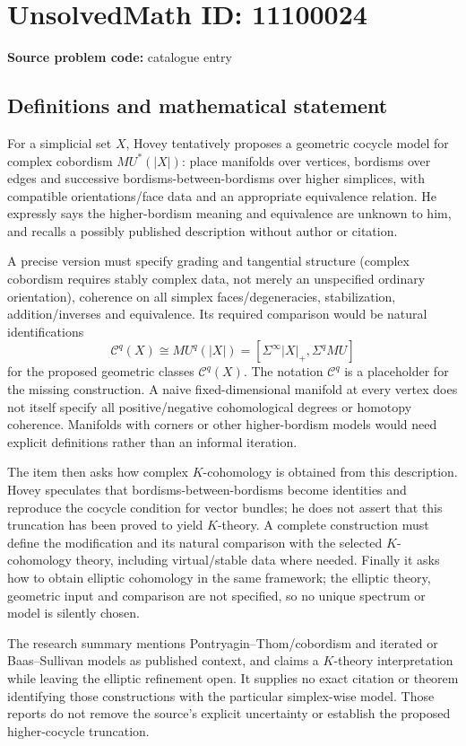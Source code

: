 \documentclass[11pt]{article}
\begin{document}
\section*{UnsolvedMath ID: 11100024}
\textbf{Source problem code:} catalogue entry
\subsection{Definitions and mathematical statement}
For a simplicial set \(X\), Hovey tentatively proposes a geometric cocycle model for complex cobordism \(MU^*(|X|)\): place manifolds over vertices, bordisms over edges and successive bordisms-between-bordisms over higher simplices, with compatible orientations/face data and an appropriate equivalence relation. He expressly says the higher-bordism meaning and equivalence are unknown to him, and recalls a possibly published description without author or citation.

A precise version must specify grading and tangential structure (complex cobordism requires stably complex data, not merely an unspecified ordinary orientation), coherence on all simplex faces/degeneracies, stabilization, addition/inverses and equivalence. Its required comparison would be natural identifications
\[\mathcal C^q(X)\cong MU^q(|X|)=[\Sigma^\infty|X|_+,\Sigma^q MU]\]
for the proposed geometric classes \(\mathcal C^q(X)\). The notation \(\mathcal C^q\) is a placeholder for the missing construction. A naive fixed-dimensional manifold at every vertex does not itself specify all positive/negative cohomological degrees or homotopy coherence. Manifolds with corners or other higher-bordism models would need explicit definitions rather than an informal iteration.

The item then asks how complex \(K\)-cohomology is obtained from this description. Hovey speculates that bordisms-between-bordisms become identities and reproduce the cocycle condition for vector bundles; he does not assert that this truncation has been proved to yield \(K\)-theory. A complete construction must define the modification and its natural comparison with the selected \(K\)-cohomology theory, including virtual/stable data where needed. Finally it asks how to obtain elliptic cohomology in the same framework; the elliptic theory, geometric input and comparison are not specified, so no unique spectrum or model is silently chosen.

The research summary mentions Pontryagin--Thom/cobordism and iterated or Baas--Sullivan models as published context, and claims a \(K\)-theory interpretation while leaving the elliptic refinement open. It supplies no exact citation or theorem identifying those constructions with the particular simplex-wise model. Those reports do not remove the source's explicit uncertainty or establish the proposed higher-cocycle truncation.
\end{document}
